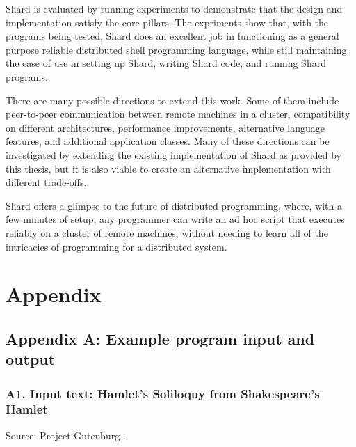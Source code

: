 \documentclass[twoside]{report}
\begin{document}
Shard is evaluated by running experiments to demonstrate that the design and implementation satisfy the core pillars. The expriments show that, with the programs being tested, Shard does an excellent job in functioning as a general purpose reliable distributed shell programming language, while still maintaining the ease of use in setting up Shard, writing Shard code, and running Shard programs.

There are many possible directions to extend this work.
Some of them include peer-to-peer communication between remote machines in a cluster, compatibility on different architectures, performance improvements, alternative language features, and additional application classes.
Many of these directions can be investigated by extending the existing implementation of Shard as provided by this thesis, but it is also viable to create an alternative implementation with different trade-offs.

Shard offers a glimpse to the future of distributed programming, where, with a few minutes of setup, any programmer can write an ad hoc script that executes reliably on a cluster of remote machines, without needing to learn all of the intricacies of programming for a distributed system.


\chapter{Appendix}
\section{Appendix A: Example program input and output}

\subsection{A1. Input text: Hamlet's Soliloquy from Shakespeare's Hamlet}

Source: Project Gutenburg \cite{hamlet}.
\end{document}
